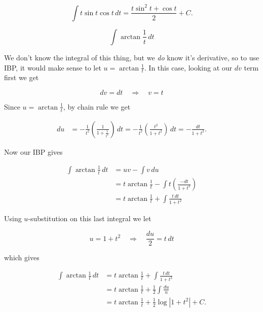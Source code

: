 \documentclass[12pt, letterpaper]{article}
\begin{document}
\begin{equation*}
\boxed{
\int t\sin{t}\cos{t} \, dt
  = \frac{t\sin^2{t} + \cos{t}}{2} + C.
}
\end{equation*}

\newpage

$$ \int \arctan{\frac{1}{t}} \, dt $$

We don't know the integral of this thing, but we \emph{do} know it's derivative, so to use IBP, it would make sense to let $u = \arctan{\frac{1}{t}}$. In this case, looking at our $dv$ term first we get

$$ dv = dt \quad \Rightarrow \quad v = t$$

Since $u = \arctan{\frac{1}{t}}$, by chain rule we get

\begin{equation*}
\begin{aligned}
du &= -\frac{1}{t^2} \left( \frac{1}{1 + \frac{1}{t^2}} \right) \, dt
    = -\frac{1}{t^2} \left( \frac{t^2}{1 + t^2} \right) \, dt
    = - \frac{dt}{1+t^2}.
\end{aligned}
\end{equation*}

Now our IBP gives

\begin{equation*}
\begin{aligned}
\int \arctan{\frac{1}{t}} \, dt
  &= uv - \int v \, du \\[0.2in]
  &= t \arctan{\frac{1}{t}} - \int t \left( \frac{-dt}{1+t^2} \right) \\[0.2in]
  &= t \arctan{\frac{1}{t}} + \int \frac{t \, dt}{1 + t^2}
\end{aligned}
\end{equation*}

Using $u$-substitution on this last integral we let

$$ u = 1 + t^2 \quad \Rightarrow \quad \frac{du}{2} = t \, dt$$

which gives

\begin{equation*}
\begin{aligned}
\int \arctan{\frac{1}{t}} \, dt
  &= t \arctan{\frac{1}{t}} + \int \frac{t \, dt}{1 + t^2} \\[0.2in]
  &= t \arctan{\frac{1}{t}} + \frac{1}{2} \int \frac{du}{u} \\[0.2in]
  &= t \arctan{\frac{1}{t}} + \frac{1}{2} \log{|1 + t^2|} + C. \\[0.2in]
\end{aligned}
\end{equation*}
\end{document}

